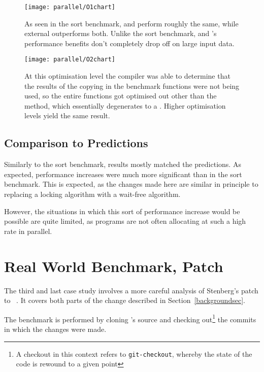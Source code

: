 \begin{figure}[p]
	\centering
	\texttt{[image: parallel/O1chart]}
	\caption{As seen in the sort benchmark,  and  perform roughly the same, while external outperforms both. Unlike the sort benchmark,  and 's performance benefits don't completely drop off on large input data.}
\end{figure}

\begin{figure}[p]
	\centering
	\texttt{[image: parallel/O2chart]}
	\caption{At this optimisation level the compiler was able to determine that the results of the copying in the benchmark functions were not being used, so the entire functions got optimised out other than the  method, which essentially degenerates to a . Higher optimisation levels yield the same result.}\label{lastparallel}
\end{figure}

\subsection{Comparison to Predictions}

Similarly to the sort benchmark, results mostly matched the predictions. As expected, performance increases were much more significant than in the sort benchmark. This is expected, as the changes made here are similar in principle to replacing a locking algorithm with a wait-free algorithm.

However, the situations in which this sort of performance increase would be possible are quite limited, as programs are not often allocating at such a high rate in parallel.

\pagebreak

\section{Real World Benchmark,  Patch}

The third and last case study involves a more careful analysis of Stenberg's patch to ~\cite{curlmalloc}. It covers both parts of the change described in Section~\ref{backgroundsec}.

The benchmark is performed by cloning 's source and checking out\footnote{A checkout in this context refers to \texttt{git-checkout}, whereby the state of the code is rewound to a given point} the commits in which the changes were made.

